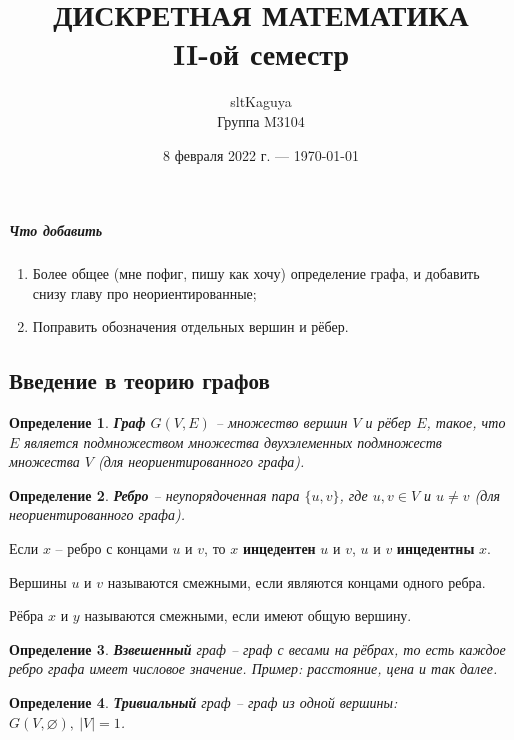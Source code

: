 \documentclass[a4paper,12pt]{article}
\title{ДИСКРЕТНАЯ МАТЕМАТИКА\\
    \large II-ой семестр}
\author{sltKaguya\\
    Группа M3104}
\date{8 февраля 2022 г. --- \today}
\newtheorem*{defin}{Определение}
\begin{document}
\maketitle
\newpage
{}

\subparagraph*{Что добавить}
\begin{enumerate}
    \item Более общее (мне пофиг, пишу как хочу) определение графа, и добавить снизу главу про неориентированные;
    \item Поправить обозначения отдельных вершин и рёбер.
\end{enumerate}

\begin{center}
    \section*{Введение в теорию графов}
\end{center}

\begin{defin}
    \textbf{Граф} $G(V, E)$ -- множество вершин $V$ и рёбер $E$, такое, что $E$ является подмножеством множества двухэлеменных подмножеств множества $V$ (для\newline
    неориентированного графа).
\end{defin}

\begin{defin}
    \textbf{Ребро} -- неупорядоченная пара $\{u, v\}$, где $u, v \in V$ и $u \not=v$ (для\newline
    неориентированного графа).
\end{defin}

Если $x$ -- ребро с концами $u$ и $v$, то $x$ \textbf{инцедентен} $u$ и $v$, $u$ и $v$ \textbf{инцедентны} $x$.

Вершины $u$ и $v$ называются смежными, если являются концами одного ребра.

Рёбра $x$ и $y$ называются смежными, если имеют общую вершину.

\begin{defin}
    \textbf{Взвешенный} граф -- граф с весами на рёбрах, то есть каждое ребро графа имеет числовое значение. Пример: расстояние, цена и так далее.
\end{defin}

\begin{defin}
    \textbf{Тривиальный} граф -- граф из одной вершины: $G(V, \varnothing), \ |V| = 1$.
\end{defin}
\end{document}
